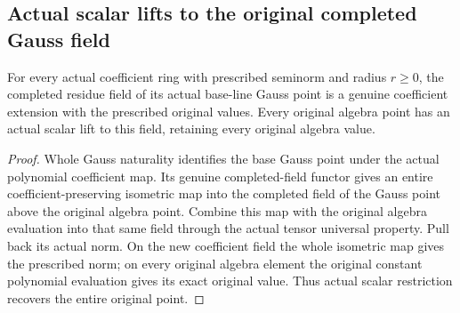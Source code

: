 \subsection{Actual scalar lifts to the original completed Gauss field}

\begin{lemma}
\label{lem:fc-gauss-scalar-tensor-lift}
\leanok
{}
For every actual coefficient ring with prescribed seminorm and radius
$r\ge0$, the completed residue field of its actual base-line Gauss
point is a genuine coefficient extension with the prescribed original
values. Every original algebra point has an actual scalar lift to this
field, retaining every original algebra value.
\end{lemma}
\begin{proof}
Whole Gauss naturality identifies the base Gauss point under the actual
polynomial coefficient map. Its genuine completed-field functor gives
an entire coefficient-preserving isometric map into the completed field
of the Gauss point above the original algebra point. Combine this map
with the original algebra evaluation into that same field through the
actual tensor universal property. Pull back its actual norm. On the
new coefficient field the whole isometric map gives the prescribed
norm; on every original algebra element the original constant
polynomial evaluation gives its exact original value. Thus actual
scalar restriction recovers the entire original point.
\end{proof}

